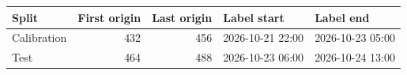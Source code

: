 \begin{tabular}{lrrll}
\toprule
Split & First origin & Last origin & Label start & Label end \\
\midrule
Calibration & 432 & 456 & 2026-10-21 22:00 & 2026-10-23 05:00 \\
Test & 464 & 488 & 2026-10-23 06:00 & 2026-10-24 13:00 \\
\bottomrule
\end{tabular}
